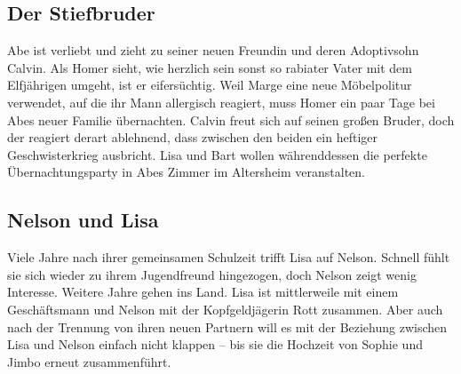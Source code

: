 
\subsection{Der Stiefbruder}
Abe ist verliebt und zieht zu seiner neuen Freundin und deren Adoptivsohn Calvin. Als Homer sieht, wie herzlich sein sonst so rabiater Vater mit dem Elfjährigen umgeht, ist er eifersüchtig. Weil Marge eine neue Möbelpolitur verwendet, auf die ihr Mann allergisch reagiert, muss Homer ein paar Tage bei Abes neuer Familie übernachten. Calvin freut sich auf seinen großen Bruder, doch der reagiert derart ablehnend, dass zwischen den beiden ein heftiger Geschwisterkrieg ausbricht. Lisa und Bart wollen währenddessen die perfekte Übernachtungsparty in Abes Zimmer im Altersheim veranstalten.


\subsection{Nelson und Lisa}
Viele Jahre nach ihrer gemeinsamen Schulzeit trifft Lisa auf Nelson. Schnell fühlt sie sich wieder zu ihrem Jugendfreund hingezogen, doch Nelson zeigt wenig Interesse. Weitere Jahre gehen ins Land. Lisa ist mittlerweile mit einem Geschäftsmann und Nelson mit der Kopfgeldjägerin Rott zusammen. Aber auch nach der Trennung von ihren neuen Partnern will es mit der Beziehung zwischen Lisa und Nelson einfach nicht klappen -- bis sie die Hochzeit von Sophie und Jimbo erneut zusammenführt.



